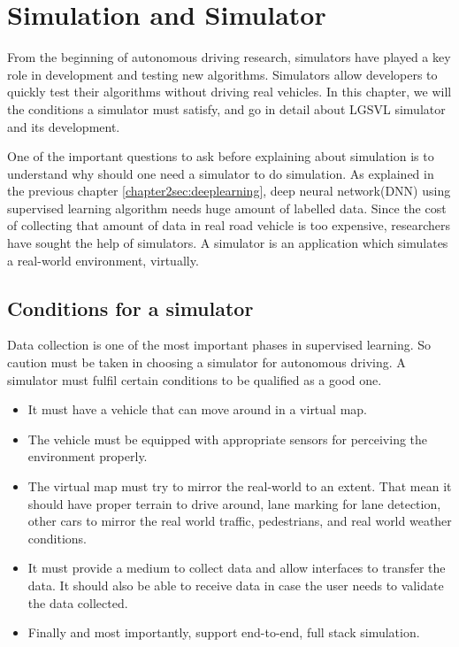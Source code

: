 \chapter{Simulation and Simulator}
From the beginning of autonomous driving research, simulators have played a key role in
development and testing new algorithms. Simulators allow developers to quickly test their
algorithms without driving real vehicles. In this chapter, we will the conditions a
simulator must satisfy, and go in detail about LGSVL simulator and its development.

One of the important questions to ask before explaining about simulation is to understand
why should one need a simulator to do simulation. As explained in the previous chapter
\ref{chapter2sec:deeplearning}, deep neural network(DNN) using supervised learning algorithm
needs huge amount of labelled data. Since the cost of collecting that amount of data in
real road vehicle is too expensive, researchers have sought the help of simulators. A
simulator is an application which simulates a real-world environment, virtually.

\section{Conditions for a simulator}

Data collection is one of the most important phases in supervised learning. So caution must
be taken in choosing a simulator for autonomous driving. A simulator must fulfil certain conditions to be
qualified as a good one.
\begin{itemize}
    \item It must have a vehicle that can move around in a virtual map.
    \item The vehicle must be equipped with appropriate sensors for perceiving the
        environment properly.
    \item The virtual map must try to mirror the real-world to an extent. That mean it
        should have proper terrain to drive around, lane marking for lane detection, other
        cars to mirror the real world traffic, pedestrians, and real world weather
        conditions.
    \item It must provide a medium to collect data and allow interfaces to transfer the
        data. It should also be able to receive data in case the user needs to validate
        the data collected.
    \item Finally and most importantly, support end-to-end, full stack simulation.
\end{itemize}

